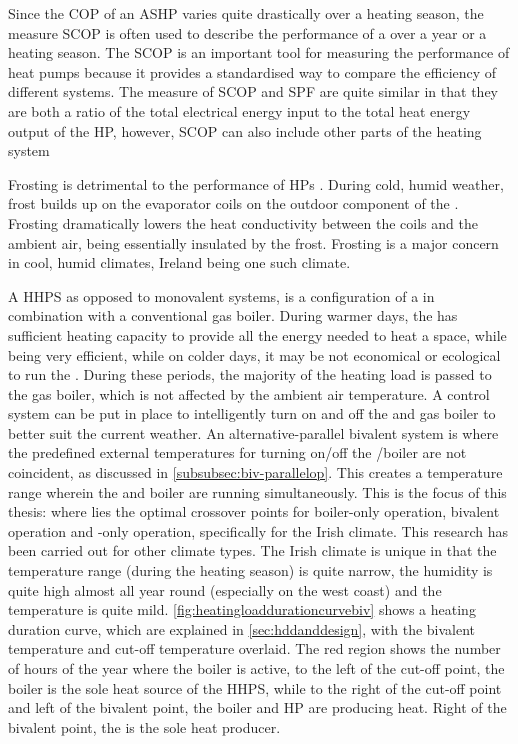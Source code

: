 Since the \ac{COP} of an \ac{ASHP} varies quite drastically over a heating season, the measure \ac{SCOP} is often used to describe the performance of a \HP over a year or a heating season. The  \ac{SCOP} is an important tool for measuring the performance of heat pumps because it provides a standardised way to compare the efficiency of different systems. The measure of \ac{SCOP} and \ac{SPF} are quite similar in that they are both a ratio of the total electrical energy input to the total heat energy output of the \ac{HP}, however, \ac{SCOP} can also include other parts of the heating system 

Frosting is detrimental to the performance of \acp{HP} \cite{di_perna_experimental_2015}. During cold, humid weather, frost builds up on the evaporator coils on the outdoor component of the \HP. Frosting dramatically lowers the heat conductivity between the coils and the ambient air, being essentially insulated by the frost. Frosting is a major concern in cool, humid climates, Ireland being one such climate.

A \ac{HHPS} as opposed to monovalent systems, is a configuration of a \HP in combination with a conventional gas boiler. During warmer days, the \HP has sufficient heating capacity to provide all the energy needed to heat a space, while being very efficient, while on colder days, it may be not economical or ecological to run the \HP. During these periods, the majority of the heating load is passed to the gas boiler, which is not affected by the ambient air temperature. A control system can be put in place to intelligently turn on and off the \HP and gas boiler to better suit the current weather. An alternative-parallel bivalent system is where the predefined external temperatures for turning on/off the \HP/boiler are not coincident, as discussed in \cref{subsubsec:biv-parallelop}. This creates a temperature range wherein the \HP and boiler are running simultaneously. This is the focus of this thesis: where lies the optimal crossover points for boiler-only operation, bivalent operation and \HP-only operation, specifically for the Irish climate. This research has been carried out for other climate types. The Irish climate is unique in that the temperature range (during the heating season) is quite narrow, the humidity is quite high almost all year round (especially on the west coast) and the temperature is quite mild. \cref{fig:heatingloaddurationcurvebiv} shows a heating duration curve, which are explained in \cref{sec:hddanddesign}, with the bivalent temperature and cut-off temperature overlaid. The red region shows the number of hours of the year where the boiler is active, to the left of the cut-off point, the boiler is the sole heat source of the \ac{HHPS}, while to the right of the cut-off point and left of the bivalent point, the boiler and \ac{HP} are producing heat. Right of the bivalent point, the \HP is the sole heat producer. 

